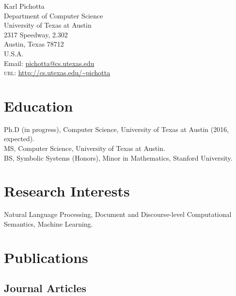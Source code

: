 \documentclass[11pt, letterpaper]{article} %
\newcommand{\years}[1]{\marginnote{\scriptsize #1}} %
\begin{document}

{\LARGE Karl Pichotta}\\[1cm] %
Department of Computer Science \\
  University of Texas at Austin \\
  2317 Speedway, 2.302 \\
	Austin, Texas 78712 \\
U.S.A.\\[.2cm]
Email: \href{mailto:pichotta@cs.utexas.edu}{pichotta@cs.utexas.edu}\\ %
\textsc{url}: \url{http://cs.utexas.edu/~pichotta}\\




\section*{Education}

  \years{}Ph.D (in progress), Computer Science, University of
  Texas at Austin (2016, expected). \\
  \years{2013}MS, Computer Science, University of Texas at Austin. \\
  \years{2008}BS, Symbolic Systems (Honors), Minor in Mathematics, Stanford
  University.



\section*{Research Interests}

Natural Language Processing,
Document and Discourse-level Computational Semantics,
Machine Learning.


\section*{Publications}

\subsection*{Journal Articles}
\end{document}
